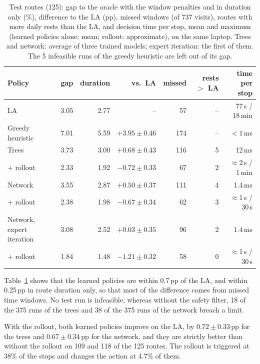 \documentclass[runningheads]{llncs}
\begin{document}
\begin{table}[t]
\caption{Test routes (125): gap to the oracle with the window penalties and in
duration only (\%), difference to the LA (pp), missed windows (of 737 visits),
routes with more daily rests than the LA, and decision time per stop, mean and
maximum (learned policies alone: mean; rollout: approximate), on the same
laptop. Trees and network: average of three trained models; expert iteration:
the first of them. The 5 infeasible runs of the greedy heuristic are left out
of its gap.}
\label{tab:base}
\centering\small
\setlength{\tabcolsep}{3.2pt}
\begin{tabular}{@{}lrrrrrr@{}}
\toprule
Policy & gap & duration & vs.\ LA & missed & rests $>$ LA & time per stop\\
\midrule
LA & 3.05 & 2.77 & -- & 57 & -- & 77\,s / 18\,min\\
Greedy heuristic~\cite{pagnier2026scheduling} & 7.01 & 5.59 & $+3.95\pm0.46$ & 174 & -- & $<1$\,ms\\
\midrule
Trees & 3.73 & 3.00 & $+0.68\pm0.43$ & 116 & 5 & 12\,ms\\
\quad + rollout & 2.33 & 1.92 & $-0.72\pm0.33$ & 67 & 2 & $\approx$2\,s / 1\,min\\
Network & 3.55 & 2.87 & $+0.50\pm0.37$ & 111 & 4 & 1.4\,ms\\
\quad + rollout & 2.38 & 1.98 & $-0.67\pm0.34$ & 62 & 3 & $\approx$1\,s / 30\,s\\
\midrule
Network, expert iteration & 3.08 & 2.52 & $+0.03\pm0.35$ & 96 & 2 & 1.4\,ms\\
\quad + rollout & 1.84 & 1.48 & $-1.21\pm0.32$ & 58 & 0 & $\approx$1\,s / 30\,s\\
\bottomrule
\end{tabular}
\end{table}

Table~\ref{tab:base} shows that the learned policies are within 0.7\,pp of
the LA, and within 0.25\,pp in route duration only, so that most of the
difference comes from missed time windows. No test run is infeasible, whereas
without the safety filter, 18 of the 375 runs of the trees and 38 of the 375
runs of the network breach a limit.

With the rollout, both learned policies improve on the LA, by
$0.72\pm0.33$\,pp for the trees and $0.67\pm0.34$\,pp for the network, and
they are strictly better than without the rollout on 109 and 118 of the 125
routes. The rollout is triggered at 38\% of the stops and changes the action
at 4.7\% of them.
\end{document}

